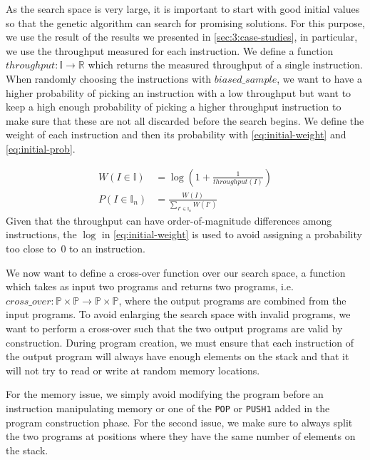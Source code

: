   As the search space is very large, it is important to start with good initial values so that the genetic algorithm can search for promising solutions. For this purpose, we use the result of the results we presented in \autoref{sec:3:case-studies}, in particular, we use the throughput measured for each instruction. We define a function $throughput : \mathbb{I} \rightarrow \mathbb{R}$ which returns the measured throughput of a single instruction. When randomly choosing the instructions with $biased\_sample$, we want to have a higher probability of picking an instruction with a low throughput but want to keep a high enough probability of picking a higher throughput instruction to make sure that these are not all discarded before the search begins. We define the weight of each instruction and then its probability with \autoref{eq:initial-weight} and \autoref{eq:initial-prob}.

  \begin{align}
    \label{eq:initial-weight}
    W(I\in \mathbb{I})   & = \log\left(1 + \frac{1}{throughput(I)}\right) \\
    \label{eq:initial-prob}
    P(I\in \mathbb{I}_n) & = \frac{W(I)}{\sum_{I'\in \mathbb{I}_n}W(I')}
  \end{align}
  Given that the throughput can have order-of-magnitude differences among instructions, the $\log$ in \autoref{eq:initial-weight} is used to avoid assigning a probability too close to~$0$ to an instruction.

  We now want to define a cross-over function over our search space, a function which takes as input two programs and returns two programs, i.e. $cross\_over : \mathbb{P} \times \mathbb{P} \rightarrow \mathbb{P} \times \mathbb{P}$, where the output programs are combined from the input programs. To avoid enlarging the search space with invalid programs, we want to perform a cross-over such that the two output programs are valid by construction.
  During program creation, we must ensure that each instruction of the output program will always have enough elements on the stack and that it will not try to read or write at random memory locations.

  For the memory issue, we simply avoid modifying the program before an instruction manipulating memory or one of the \lstinline{POP} or \lstinline{PUSH1} added in the program construction phase. For the second issue, we make sure to always split the two programs at positions where they have the same number of elements on the stack.

